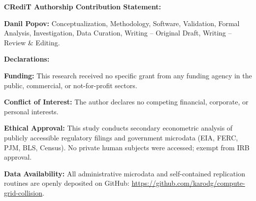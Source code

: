 \documentclass[11pt]{article}
\begin{document}
\noindent \textbf{CRediT Authorship Contribution Statement:}\par
\noindent \textbf{Danil Popov:} Conceptualization, Methodology, Software, Validation, Formal Analysis, Investigation, Data Curation, Writing -- Original Draft, Writing -- Review \& Editing.\par
\vspace{0.3cm}

\noindent \textbf{Declarations:}\par
\noindent \textbf{Funding:} This research received no specific grant from any funding agency in the public, commercial, or not-for-profit sectors.\par
\noindent \textbf{Conflict of Interest:} The author declares no competing financial, corporate, or personal interests.\par
\noindent \textbf{Ethical Approval:} This study conducts secondary econometric analysis of publicly accessible regulatory filings and government microdata (EIA, FERC, PJM, BLS, Census). No private human subjects were accessed; exempt from IRB approval.\par
\noindent \textbf{Data Availability:} All administrative microdata and self-contained replication routines are openly deposited on GitHub: \url{https://github.com/karodg/compute-grid-collision}.
\end{document}
